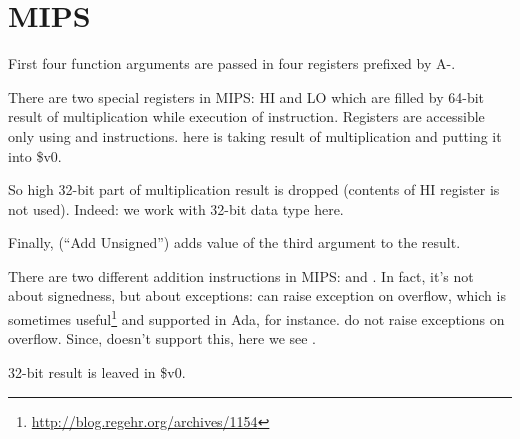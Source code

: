 ﻿\ifx\RUSSIAN\undefined
\section{MIPS}



First four function arguments are passed in four registers prefixed by A-.

There are two special registers in MIPS: HI and LO which are filled by 64-bit result of multiplication while
execution of  instruction.
Registers are accessible only using  and  instructions.
 here is taking result of multiplication and putting it into \$v0.

So high 32-bit part of multiplication result is dropped (contents of HI register is not used).
Indeed: we work with 32-bit \Tint data type here.

Finally,  (``Add Unsigned'') adds value of the third argument to the result.

There are two different addition instructions in MIPS:  and .
In fact, it's not about signedness, but about exceptions:  can raise exception on overflow,
which is sometimes useful\footnote{\url{http://blog.regehr.org/archives/1154}} and supported in Ada, for instance.
 do not raise exceptions on overflow.
Since, \CCpp doesn't support this, here we see .

32-bit result is leaved in \$v0.

\fi
